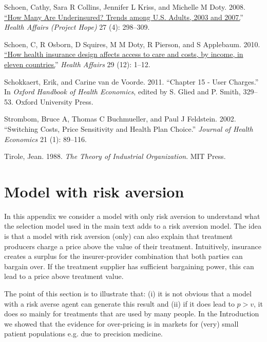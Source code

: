 \documentclass[a4paper,12pt]{article}
\begin{document}
\hypertarget{citeproc_bib_item_37}{Schoen, Cathy, Sara R Collins, Jennifer L Kriss, and Michelle M Doty. 2008. \href{https://www.ncbi.nlm.nih.gov/pubmed/18544591}{“How Many Are Underinsured? Trends among U.S. Adults, 2003 and 2007.}” \textit{Health Affairs (Project Hope)} 27 (4): 298–309.}

\hypertarget{citeproc_bib_item_38}{Schoen, C, R Osborn, D Squires, M M Doty, R Pierson, and S Applebaum. 2010. \href{https://www.ncbi.nlm.nih.gov/pubmed/21088012}{“How health insurance design affects access to care and costs, by income, in eleven countries.}” \textit{Health Affairs} 29 (12): 1–12.}

\hypertarget{citeproc_bib_item_39}{Schokkaert, Erik, and Carine van de Voorde. 2011. “Chapter 15 - User Charges.” In \textit{Oxford Handbook of Health Economics}, edited by S. Glied and P. Smith, 329–53. Oxford University Press.}

\hypertarget{citeproc_bib_item_40}{Strombom, Bruce A, Thomas C Buchmueller, and Paul J Feldstein. 2002. “Switching Costs, Price Sensitivity and Health Plan Choice.” \textit{Journal of Health Economics} 21 (1): 89–116.}

\hypertarget{citeproc_bib_item_41}{Tirole, Jean. 1988. \textit{The Theory of Industrial Organization}. MIT Press.}\bigskip



\newpage
\appendix



\setcounter{table}{0}
\renewcommand{\thetable}{\thesection\arabic{table}}


\section{Model with risk aversion}
\label{sec:org80d6772}

In this appendix we consider a model with only risk aversion to understand what the selection model used in the main text adds to a risk aversion model. The idea is that a model with risk aversion (only) can also explain that treatment producers charge a price above the value of their treatment. Intuitively, insurance creates a surplus for the insurer-provider combination that both parties can bargain over. If the treatment supplier has sufficient bargaining power, this can lead to a price above treatment value.

The point of this section is to illustrate that: (i) it is not obvious that a model with a risk averse agent can generate this result and (ii) if it does lead to \(p>v\), it does so mainly for treatments that are used by many people. In the Introduction we showed that the evidence for over-pricing is in markets for (very) small patient populations e.g. due to precision medicine.
\end{document}
